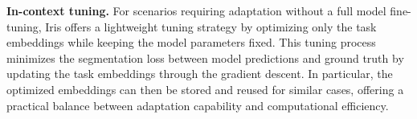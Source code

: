 \noindent\textbf{In-context tuning.} For scenarios requiring adaptation without a full model fine-tuning, Iris offers a lightweight tuning strategy by optimizing only the task embeddings while keeping the model parameters fixed. This tuning process minimizes the segmentation loss between model predictions and ground truth by updating the task embeddings through the gradient descent. In particular, the optimized embeddings can then be stored and reused for similar cases, offering a practical balance between adaptation capability and computational efficiency.



